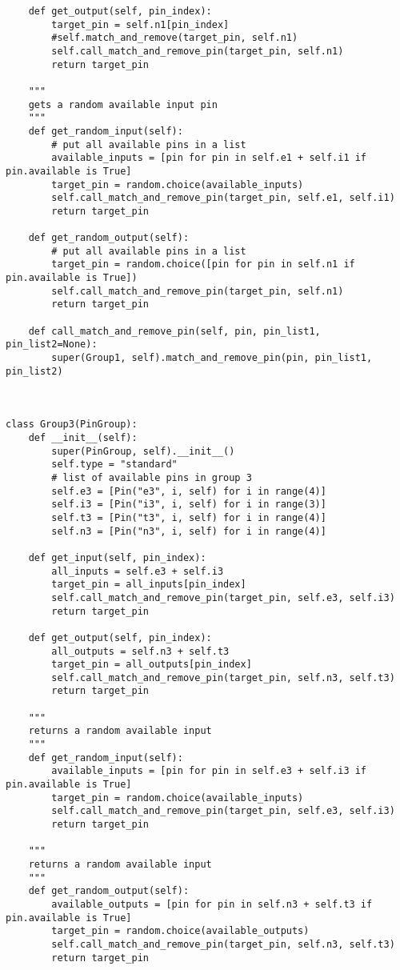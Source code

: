 \documentclass[a4paper]{article}
\begin{document}
\begin{verbatim}
    def get_output(self, pin_index):
        target_pin = self.n1[pin_index]
        #self.match_and_remove(target_pin, self.n1)
        self.call_match_and_remove_pin(target_pin, self.n1)
        return target_pin

    """
    gets a random available input pin
    """
    def get_random_input(self):
        # put all available pins in a list
        available_inputs = [pin for pin in self.e1 + self.i1 if pin.available is True]
        target_pin = random.choice(available_inputs)
        self.call_match_and_remove_pin(target_pin, self.e1, self.i1)
        return target_pin

    def get_random_output(self):
        # put all available pins in a list
        target_pin = random.choice([pin for pin in self.n1 if pin.available is True])
        self.call_match_and_remove_pin(target_pin, self.n1)
        return target_pin

    def call_match_and_remove_pin(self, pin, pin_list1, pin_list2=None):
        super(Group1, self).match_and_remove_pin(pin, pin_list1, pin_list2)



class Group3(PinGroup):
    def __init__(self):
        super(PinGroup, self).__init__()
        self.type = "standard"
        # list of available pins in group 3
        self.e3 = [Pin("e3", i, self) for i in range(4)]
        self.i3 = [Pin("i3", i, self) for i in range(3)]
        self.t3 = [Pin("t3", i, self) for i in range(4)]
        self.n3 = [Pin("n3", i, self) for i in range(4)]

    def get_input(self, pin_index):
        all_inputs = self.e3 + self.i3
        target_pin = all_inputs[pin_index]
        self.call_match_and_remove_pin(target_pin, self.e3, self.i3)
        return target_pin

    def get_output(self, pin_index):
        all_outputs = self.n3 + self.t3
        target_pin = all_outputs[pin_index]
        self.call_match_and_remove_pin(target_pin, self.n3, self.t3)
        return target_pin

    """
    returns a random available input
    """
    def get_random_input(self):
        available_inputs = [pin for pin in self.e3 + self.i3 if pin.available is True]
        target_pin = random.choice(available_inputs)
        self.call_match_and_remove_pin(target_pin, self.e3, self.i3)
        return target_pin

    """
    returns a random available input
    """
    def get_random_output(self):
        available_outputs = [pin for pin in self.n3 + self.t3 if pin.available is True]
        target_pin = random.choice(available_outputs)
        self.call_match_and_remove_pin(target_pin, self.n3, self.t3)
        return target_pin


\end{verbatim}
\end{document}
